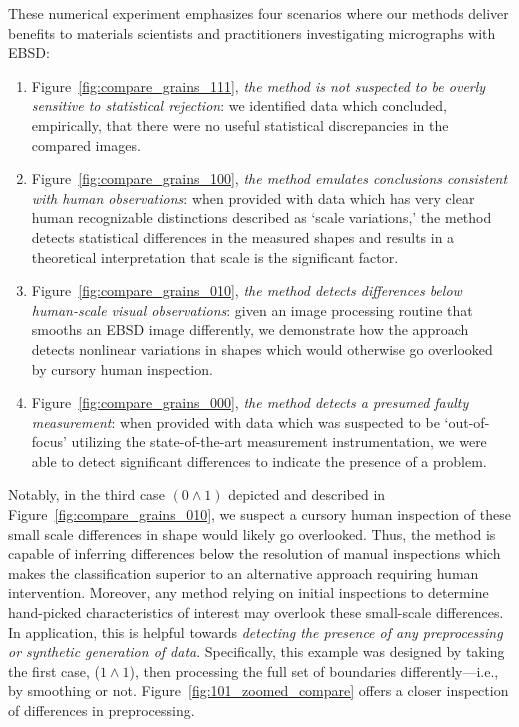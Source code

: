 \documentclass[pdflatex,iicol]{sn-jnl}%
\theoremstyle{thmstyleone}%
\theoremstyle{thmstyletwo}%
\theoremstyle{thmstylethree}%
\begin{document}
These numerical experiment emphasizes four scenarios where our methods deliver benefits to materials scientists and practitioners investigating micrographs with EBSD: 
\begin{enumerate}
    \item Figure~\ref{fig:compare_grains_111}, \textit{the method is not suspected to be overly sensitive to statistical rejection}: we identified data which concluded, empirically, that there were no useful statistical discrepancies in the compared images.
    \item Figure~\ref{fig:compare_grains_100}, \textit{the method emulates conclusions consistent with human observations}: when provided with data which has very clear human recognizable distinctions described as `scale variations,' the method detects statistical differences in the measured shapes and results in a theoretical interpretation that scale is the significant factor. 
    \item Figure~\ref{fig:compare_grains_010}, \textit{the method detects differences below human-scale visual observations}: given an image processing routine that smooths an EBSD image differently, we demonstrate how the approach detects nonlinear variations in shapes which would otherwise go overlooked by cursory human inspection.
    \item Figure~\ref{fig:compare_grains_000}, \textit{the method detects a presumed faulty measurement}: when provided with data which was suspected to be `out-of-focus' utilizing the state-of-the-art measurement instrumentation, we were able to detect significant differences to indicate the presence of a problem. 
\end{enumerate}

Notably, in the third case $(0 \wedge 1)$ depicted and described in Figure~\ref{fig:compare_grains_010}, we suspect a cursory human inspection of these small scale differences in shape would likely go overlooked. Thus, the method is capable of inferring differences below the resolution of manual inspections which makes the classification superior to an alternative approach requiring human intervention. Moreover, any method relying on initial inspections to determine hand-picked characteristics of interest may overlook these small-scale differences. In application, this is helpful towards \textit{detecting the presence of any preprocessing or synthetic generation of data}. Specifically, this example was designed by taking the first case, ($1 \wedge 1$), then processing the full set of boundaries differently---i.e., by smoothing or not. Figure~\ref{fig:101_zoomed_compare} offers a closer inspection of differences in preprocessing. 
\end{document}
